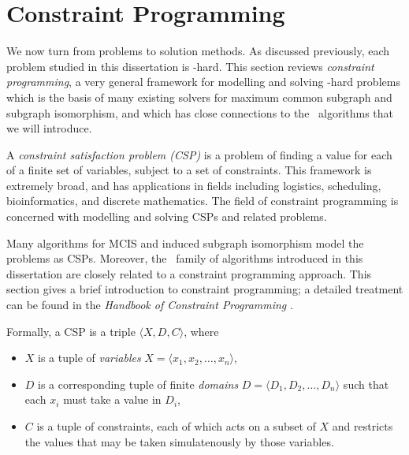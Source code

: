 
\section{Constraint Programming}\label{sec:cp}

We now turn from problems to solution methods.  As discussed previously, each
problem studied in this dissertation is \NP-hard.  This section reviews
\emph{constraint programming}, a very general framework for modelling and
solving \NP-hard problems which is the basis of many existing solvers for
maximum common subgraph and subgraph isomorphism, and which has close
connections to the \McSplit\ algorithms that we will introduce.

A \emph{constraint satisfaction problem (CSP)} is a problem of finding a value
for each of a finite set of variables, subject to a set of constraints.
This framework is extremely broad, and has applications in fields
including logistics, scheduling, bioinformatics, and discrete mathematics.
The field of constraint programming is concerned with modelling
and solving CSPs and related problems.

Many algorithms
for MCIS and induced subgraph isomorphism model the problems as CSPs.
Moreover, the \McSplit\ family of algorithms introduced in this dissertation
are closely related to a constraint programming approach.
This section gives a brief introduction to constraint programming;
a detailed treatment can be found in the \emph{Handbook of Constraint
Programming} \citep{DBLP:reference/fai/2}.

Formally, a CSP is a triple $\langle X, D, C\rangle$, where

\begin{itemize}
\item $X$ is a tuple of \emph{variables} $X = \langle x_1, x_2, \dots, x_n \rangle$,
\item $D$ is a corresponding tuple of finite \emph{domains} $D = \langle D_1, D_2, \dots, D_n\rangle$
  such that each $x_i$ must take a value in $D_i$,
\item $C$ is a tuple of constraints, each of which acts on a subset of $X$ and restricts
  the values that may be taken simulatenously by those variables.
\end{itemize}

